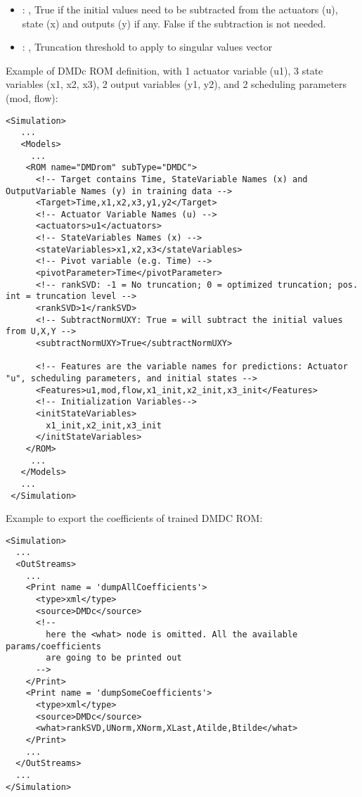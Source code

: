 \begin{itemize}
    \item {}: , 
      True if the initial values need to be subtracted from the
      actuators (u), state (x) and outputs (y) if any. False if the subtraction
      is not needed.

    \item {}: , 
      Truncation threshold to apply to singular values vector
  \end{itemize}

\hspace{24pt}
Example of DMDc ROM definition, with 1 actuator variable (u1), 3 state variables (x1, x2, x3), 2 output variables (y1, y2), and 2 scheduling parameters (mod, flow):
\begin{lstlisting}[style=XML,morekeywords={name,subType}]
<Simulation>
   ...
   <Models>
     ...
    <ROM name="DMDrom" subType="DMDC">
      <!-- Target contains Time, StateVariable Names (x) and OutputVariable Names (y) in training data -->
      <Target>Time,x1,x2,x3,y1,y2</Target>
      <!-- Actuator Variable Names (u) -->
      <actuators>u1</actuators>
      <!-- StateVariables Names (x) -->
      <stateVariables>x1,x2,x3</stateVariables>
      <!-- Pivot variable (e.g. Time) -->
      <pivotParameter>Time</pivotParameter>
      <!-- rankSVD: -1 = No truncation; 0 = optimized truncation; pos. int = truncation level -->
      <rankSVD>1</rankSVD>
      <!-- SubtractNormUXY: True = will subtract the initial values from U,X,Y -->
      <subtractNormUXY>True</subtractNormUXY>

      <!-- Features are the variable names for predictions: Actuator "u", scheduling parameters, and initial states -->
      <Features>u1,mod,flow,x1_init,x2_init,x3_init</Features>
      <!-- Initialization Variables-->
      <initStateVariables>
        x1_init,x2_init,x3_init
      </initStateVariables>
    </ROM>
     ...
   </Models>
   ...
 </Simulation>

\end{lstlisting}

Example to export the coefficients of trained DMDC ROM:
\begin{lstlisting}[style=XML,morekeywords={name,subType}]
<Simulation>
  ...
  <OutStreams>
    ...
    <Print name = 'dumpAllCoefficients'>
      <type>xml</type>
      <source>DMDc</source>
      <!--
        here the <what> node is omitted. All the available params/coefficients
        are going to be printed out
      -->
    </Print>
    <Print name = 'dumpSomeCoefficients'>
      <type>xml</type>
      <source>DMDc</source>
      <what>rankSVD,UNorm,XNorm,XLast,Atilde,Btilde</what>
    </Print>
    ...
  </OutStreams>
  ...
</Simulation>
\end{lstlisting}


